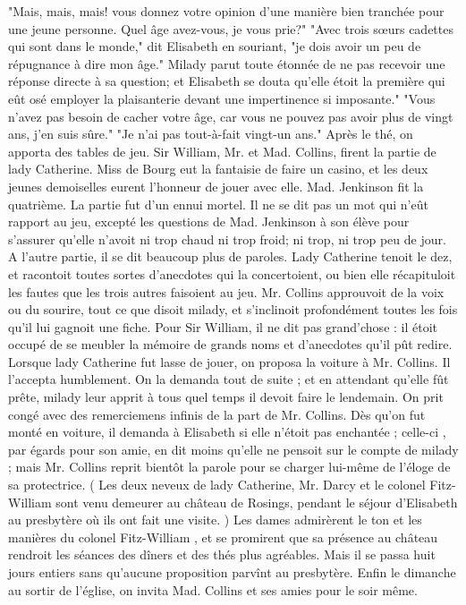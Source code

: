 "Mais, mais, mais! vous donnez votre opinion d'une manière bien tranchée pour une jeune personne. Quel âge avez-vous, je vous prie?"
"Avec trois sœurs cadettes qui sont dans le monde," dit Elisabeth en souriant, "je dois avoir un peu de répugnance à dire mon âge."
Milady parut toute étonnée de ne pas recevoir une réponse directe à sa question; et Elisabeth se douta qu'elle étoit la première qui eût osé employer la plaisanterie devant une impertinence si imposante."
"Vous n'avez pas besoin de cacher votre\setcounter{page}{538} âge, car vous ne pouvez pas avoir plus de vingt ans, j'en suis sûre."
"Je n'ai pas tout-à-fait vingt-un ans."
Après le thé, on apporta des tables de jeu. Sir William, Mr. et Mad. Collins, firent la partie de lady Catherine. Miss de Bourg eut la fantaisie de faire un casino, et les deux jeunes demoiselles eurent l'honneur de jouer avec elle. Mad. Jenkinson fit la quatrième. La partie fut d'un ennui mortel. Il ne se dit pas un mot qui n'eût rapport au jeu, excepté les questions de Mad. Jenkinson à son élève pour s'assurer qu'elle n'avoit ni trop chaud ni trop froid; ni trop, ni trop peu de jour. A l'autre partie, il se dit beaucoup plus de paroles. Lady Catherine tenoit le dez, et racontoit toutes sortes d'anecdotes qui la concertoient, ou bien elle récapituloit les fautes que les trois autres faisoient au jeu. Mr. Collins approuvoit de la voix ou du sourire, tout ce que disoit milady, et s'inclinoit profondément toutes les fois qu'il lui gagnoit une fiche. Pour Sir William, il ne dit pas grand'chose : il étoit occupé de se meubler la mémoire de grands noms et d'anecdotes qu'il pût redire.
Lorsque lady Catherine fut lasse de jouer, on proposa la voiture à Mr. Collins. Il l'accepta humblement. On la demanda tout de\setcounter{page}{539} suite ; et en attendant qu'elle fût prête, milady leur apprit à tous quel temps il devoit faire le lendemain. On prit congé avec des remerciemens infinis de la part de Mr. Collins. Dès qu'on fut monté en voiture, il demanda à Elisabeth si elle n'étoit pas enchantée ; celle-ci , par égards pour son amie, en dit moins qu'elle ne pensoit sur le compte de milady ; mais Mr. Collins reprit bientôt la parole pour se charger lui-même de l'éloge de sa protectrice.
( Les deux neveux de lady Catherine, Mr. Darcy et le colonel Fitz-William sont venu demeurer au château de Rosings, pendant le séjour d'Elisabeth au presbytère où ils ont fait une visite. )
Les dames admirèrent le ton et les manières du colonel Fitz-William , et se promirent que sa présence au château rendroit les séances des dîners et des thés plus agréables. Mais il se passa huit jours entiers sans qu'aucune proposition parvînt au presbytère. Enfin le dimanche au sortir de l'église, on invita Mad. Collins et ses amies pour le soir même.
